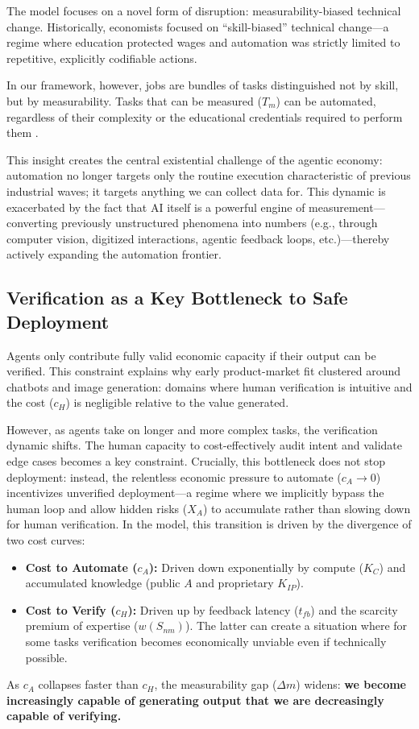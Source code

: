 \documentclass[12pt, letter]{article}
\begin{document}
The model focuses on a novel form of disruption: measurability-biased technical change. Historically, economists focused on ``skill-biased'' technical change—a regime where education protected wages and automation was strictly limited to repetitive, explicitly codifiable actions. 

In our framework, however, jobs are bundles of tasks distinguished not by skill, but by measurability. Tasks that can be measured ($T_m$) can be automated, regardless of their complexity or the educational credentials required to perform them \citep{Catalini2025}. 

This insight creates the central existential challenge of the agentic economy: automation no longer targets only the routine execution characteristic of previous industrial waves; it targets anything we can collect data for. This dynamic is exacerbated by the fact that AI itself is a powerful engine of measurement—converting previously unstructured phenomena into numbers (e.g., through computer vision, digitized interactions, agentic feedback loops, etc.)—thereby actively expanding the automation frontier.


\subsection{Verification as a Key Bottleneck to Safe Deployment}

Agents only contribute fully valid economic capacity if their output can be verified. This constraint explains why early product-market fit clustered around chatbots and image generation: domains where human verification is intuitive and the cost ($c_H$) is negligible relative to the value generated. 

However, as agents take on longer and more complex tasks, the verification dynamic shifts. The human capacity to cost-effectively audit intent and validate edge cases becomes a key constraint. Crucially, this bottleneck does not stop deployment: instead, the relentless economic pressure to automate ($c_A \to 0$) incentivizes unverified deployment—a regime where we implicitly bypass the human loop and allow hidden risks ($X_A$) to accumulate rather than slowing down for human verification. In the model, this transition is driven by the divergence of two cost curves:
\begin{itemize}
    \item \textbf{Cost to Automate ($c_A$):} Driven down exponentially by compute ($K_C$) and accumulated knowledge (public $A$ and proprietary $K_{IP}$).
    \item \textbf{Cost to Verify ($c_H$):} Driven up by feedback latency ($t_{fb}$) and the scarcity premium of expertise ($w(S_{nm})$). The latter can create a situation where for some tasks verification becomes economically unviable even if technically possible.
\end{itemize}
As $c_A$ collapses faster than $c_H$, the measurability gap ($\Delta m$) widens: \textbf{we become increasingly capable of generating output that we are decreasingly capable of verifying.} 
\end{document}
